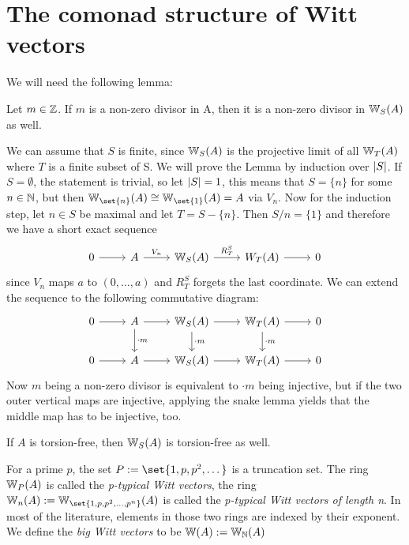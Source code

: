 \section{The comonad structure of Witt vectors}
We will need the following lemma:
\begin{lemma}\label{lem: non-zero divisor}
    Let $m \in \mathbb{Z}$. If $m$ is a non-zero divisor in A, then it is a
    non-zero divisor in $\mathbb{W}_S(A)$ as well.
\end{lemma}
\begin{beweis}
    We can assume that $S$ is finite, since $\mathbb{W}_S(A)$ is the projective limit 
    of all $\mathbb{W}_T(A)$ where $T$ is a finite subset of S.
    We will prove the Lemma by induction over $\lvert S\rvert$.
    If $S = \emptyset$, the statement is trivial, so let $\lvert S\rvert = 1$, this means
    that $S = \{n\}$ for some $n \in \mathbb{N}$, but then $\W_{\set{n}}(A) \cong \W_{\set{1}}(A) = A$ via $V_n$.
    Now for the induction step, let $n \in S$ be maximal and let $T = S - \{n\}$.
    Then $S/n = \{1\}$ and therefore we have a short exact sequence 
    \[
    \begin{tikzcd}
        0 \arrow[r]
          & A \arrow[r,"V_n"]
            & \W_S(A) \arrow[r,"R_T^S"]
              & W_T(A) \arrow[r]
                & 0
    \end{tikzcd}
    \]
    since $V_n$ maps $a$ to $(0,\dots,a)$ and $R_T^S$ forgets the last coordinate.
    We can extend the sequence to the following commutative diagram:
    \[
    \begin{tikzcd}
        0 \arrow[r] 
        & A \arrow[r] \arrow[d,"\cdot m"] 
          & \W_S(A) \arrow[r] \arrow[d,"\cdot m"]
            & \W_T(A) \arrow[d,"\cdot m"] \arrow[r]
                & 0 \\
        0 \arrow[r]
           & A \arrow[r]
            & \W_S(A) \arrow[r]
              & \W_T(A) \arrow[r]
                & 0 
    \end{tikzcd}
    \]
    Now $m$ being a non-zero divisor is equivalent to $\cdot m$ being injective, but if the
    two outer vertical maps are injective, applying the snake lemma yields that the middle map has to be 
    injective, too.
\end{beweis}
\begin{cor} 
    \label{cor: A torsion-free implies W(A) torsion-free}
    If $A$ is torsion-free, then $\mathbb{W}_S(A)$ is torsion-free as well.
\end{cor}
\begin{definition}
    For a prime $p$, the set $P := \set{1,p,p^2,\dots}$ is a truncation set.
    The ring $\mathbb{W}_P(A)$ is called the \textit{p-typical Witt vectors}, the ring
    $\W_n(A) := \W_{\set{1,p,p^2,\dots,p^n}}(A)$ is called the \textit{p-typical
    Witt vectors of length n}.    
    In most of the literature, elements in those two rings are indexed by their exponent.
    We define the \textit{big Witt vectors} to be 
    $\mathbb{W}(A) := \mathbb{W}_{\mathbb{N}}(A)$
\end{definition}
